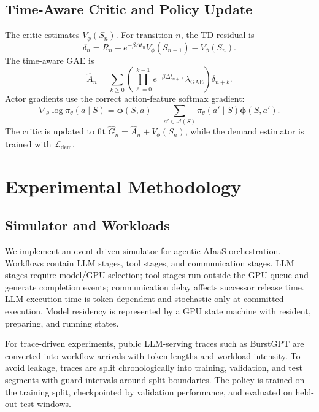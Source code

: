 \documentclass[10pt,conference]{IEEEtran}
\newcommand{\calA}{\mathcal{A}}
\newcommand{\phia}{\boldsymbol{\phi}}
\begin{document}
\subsection{Time-Aware Critic and Policy Update}

The critic estimates \(V_{\phi}(S_n)\). For transition \(n\), the TD residual is
\begin{equation}
\delta_n=R_n+e^{-\beta\Delta t_n}V_{\phi}(S_{n+1})-V_{\phi}(S_n).
\end{equation}
The time-aware GAE is
\begin{equation}
\hat A_n=\sum_{k\ge 0}
\left(\prod_{\ell=0}^{k-1} e^{-\beta\Delta t_{n+\ell}}\lambda_{\mathrm{GAE}}\right)
\delta_{n+k}.
\end{equation}
Actor gradients use the correct action-feature softmax gradient:
\begin{equation}
\nabla_{\theta}\log\pi_{\theta}(a\mid S)=
\phia(S,a)-\sum_{a'\in\calA(S)}\pi_{\theta}(a'\mid S)\phia(S,a').
\end{equation}
The critic is updated to fit \(\hat G_n=\hat A_n+V_{\phi}(S_n)\), while the demand estimator is trained with \(\mathcal{L}_{\mathrm{dem}}\).

\section{Experimental Methodology}

\subsection{Simulator and Workloads}

We implement an event-driven simulator for agentic AIaaS orchestration. Workflows contain LLM stages, tool stages, and communication stages. LLM stages require model/GPU selection; tool stages run outside the GPU queue and generate completion events; communication delay affects successor release time. LLM execution time is token-dependent and stochastic only at committed execution. Model residency is represented by a GPU state machine with resident, preparing, and running states.

For trace-driven experiments, public LLM-serving traces such as BurstGPT \cite{wang2024burstgpt} are converted into workflow arrivals with token lengths and workload intensity. To avoid leakage, traces are split chronologically into training, validation, and test segments with guard intervals around split boundaries. The policy is trained on the training split, checkpointed by validation performance, and evaluated on held-out test windows.
\end{document}
